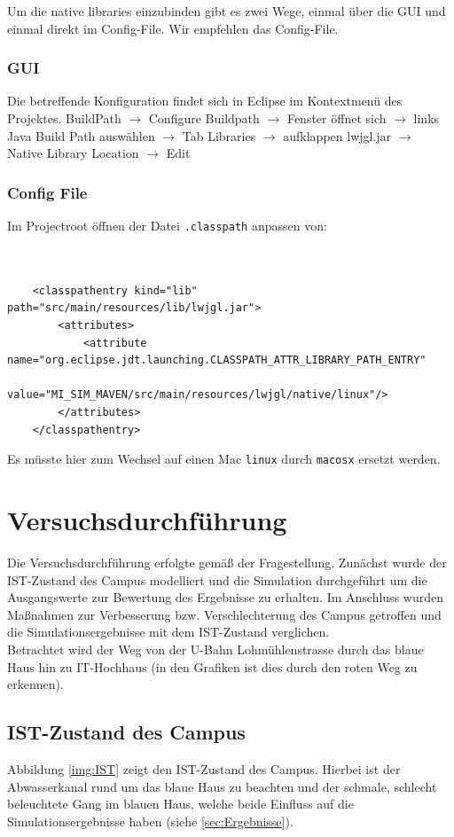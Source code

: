 \documentclass[10pt]{scrartcl}
\begin{document}
Um die native libraries einzubinden gibt es zwei Wege, einmal über die GUI und einmal direkt im Config-File. Wir empfehlen das Config-File.

\subsubsection{GUI}
Die betreffende Konfiguration findet sich in Eclipse im Kontextmenü des Projektes. BuildPath $\rightarrow$ Configure Buildpath $\rightarrow$ Fenster öffnet sich $\rightarrow$ links Java Build Path auswählen $\rightarrow$ Tab Libraries $\rightarrow$ aufklappen lwjgl.jar $\rightarrow$ Native Library Location $\rightarrow$ Edit

\subsubsection{Config File}
Im Projectroot öffnen der Datei \verb!.classpath! anpassen von:\begin{verbatim}


	<classpathentry kind="lib" path="src/main/resources/lib/lwjgl.jar">
		<attributes>
			<attribute name="org.eclipse.jdt.launching.CLASSPATH_ATTR_LIBRARY_PATH_ENTRY" 
			value="MI_SIM_MAVEN/src/main/resources/lwjgl/native/linux"/>
		</attributes>
	</classpathentry> 
\end{verbatim}

Es müsste hier zum Wechsel auf einen Mac \verb!linux! durch \verb!macosx! ersetzt werden.

\section{Versuchsdurchführung}
Die Versuchsdurchführung erfolgte gemäß der Fragestellung. Zunächst wurde der IST-Zustand des Campus modelliert und die Simulation durchgeführt um die Ausgangswerte zur Bewertung des Ergebnisse zu erhalten. Im Anschluss wurden Maßnahmen zur Verbesserung bzw. Verschlechterung des Campus getroffen und die Simulationsergebnisse mit dem IST-Zustand verglichen.\\
Betrachtet wird der Weg von der U-Bahn Lohmühlenstrasse durch das blaue Haus hin zu IT-Hochhaus (in den Grafiken ist dies durch den roten Weg zu erkennen).

\subsection{IST-Zustand des Campus}
Abbildung \ref{img:IST} zeigt den IST-Zustand des Campus. Hierbei ist der Abwasserkanal rund um das blaue Haus zu beachten und der schmale, schlecht beleuchtete Gang im blauen Haus, welche beide Einfluss auf die Simulationsergebnisse haben (siehe \ref{sec:Ergebnisse}).
\end{document}
